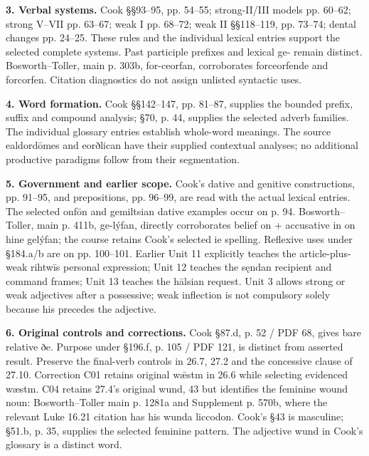 \textbf{3. Verbal systems.} Cook §§93–95, pp. 54–55; strong-II/\allowbreak{}III models pp. 60–62; strong V–VII pp. 63–67; weak I pp. 68–72; weak II §§118–119, pp. 73–74; dental changes pp. 24–25. These rules and the individual lexical entries support the selected complete systems. Past participle prefixes and lexical ge- remain distinct. Bosworth–Toller, main p. 303b, for-ceorfan, corroborates forceorfende and forcorfen. Citation diagnostics do not assign unlisted syntactic uses.

\textbf{4. Word formation.} Cook §§142–147, pp. 81–87, supplies the bounded prefix, suffix and compound analysis; §70, p. 44, supplies the selected adverb families. The individual glossary entries establish whole-word meanings. The source ealdordōmes and eorðlican have their supplied contextual analyses; no additional productive paradigms follow from their segmentation.

\textbf{5. Government and earlier scope.} Cook's dative and genitive constructions, pp. 91–95, and prepositions, pp. 96–99, are read with the actual lexical entries. The selected onfōn and gemiltsian dative examples occur on p. 94. Bosworth–Toller, main p. 411b, ge-lýfan, directly corroborates belief on + accusative in on hine gelýfan; the course retains Cook’s selected ie spelling. Reflexive uses under §184.a/\allowbreak{}b are on pp. 100–101. Earlier Unit 11 explicitly teaches the article-plus-weak rihtwīs personal expression; Unit 12 teaches the sęndan recipient and command frames; Unit 13 teaches the hālsian request. Unit 3 allows strong or weak adjectives after a possessive; weak inflection is not compulsory solely because his precedes the adjective.

\textbf{6. Original controls and corrections.} Cook §87.d, p. 52 /\allowbreak{} PDF 68, gives bare relative ðe. Purpose under §196.f, p. 105 /\allowbreak{} PDF 121, is distinct from asserted result. Preserve the final-verb controls in 26.7, 27.2 and the concessive clause of 27.10. Correction C01 retains original wǣstm in 26.6 while selecting evidenced wæstm. C04 retains 27.4's original wund, 43 but identifies the feminine wound noun: Bosworth–Toller main p. 1281a and Supplement p. 570b, where the relevant Luke 16.21 citation has his wunda liccodon. Cook's §43 is masculine; §51.b, p. 35, supplies the selected feminine pattern. The adjective wund in Cook's glossary is a distinct word.

